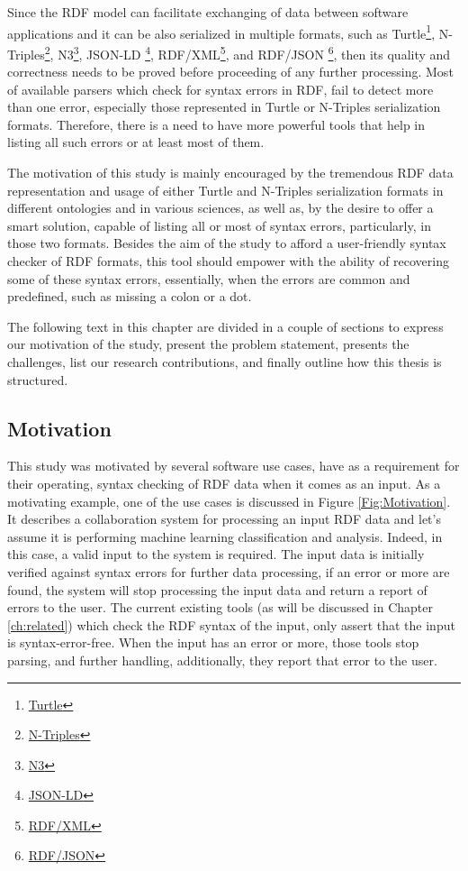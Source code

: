 Since the RDF model can facilitate  exchanging of data between software applications and it can be also serialized in multiple formats, such as Turtle\footnote{\href{https://www.w3.org/TR/turtle/}{Turtle}}, N-Triples\footnote{\href{https://www.w3.org/TR/n-triples/}{N-Triples}}, N3\footnote{\href{https://www.w3.org/TeamSubmission/n3/}{N3}}, JSON-LD	\footnote{\href{https://www.w3.org/2018/jsonld-cg-reports/json-ld/}{JSON-LD}}, RDF{/}XML\footnote{\href{https://www.w3.org/TR/rdf-syntax-grammar/}{RDF{/}XML}}, and RDF{/}JSON	\footnote{\href{https://dvcs.w3.org/hg/rdf/raw-file/default/rdf-json/index.html}{RDF{/}JSON}}, then its  quality and correctness needs to be proved before proceeding of any further processing. Most of available  parsers which check for syntax errors in RDF, fail to detect more than one error, especially those represented in Turtle or N-Triples serialization formats. Therefore, there is a need to have more powerful tools that help in listing all such errors or at least most of them.%


The motivation of this study is mainly  encouraged by the  tremendous RDF data representation and usage of either Turtle and N-Triples serialization formats in different ontologies and in various sciences, as well as, by the desire to offer a smart solution, capable of listing all or most of syntax errors, particularly, in those two formats. Besides the aim of the study to afford a user-friendly syntax checker of RDF formats, this tool should empower with the ability of recovering some of these syntax errors, essentially, when the errors are common and predefined, such as missing a colon or a dot.  


The following text in this chapter are divided in a couple of sections to express our motivation of the study, present the problem statement, presents the challenges, list our research contributions, and finally outline how this thesis is structured.  

\subsection{Motivation}

This study was motivated by several software use cases, have as a requirement for their operating, syntax checking of RDF data when it comes as an input. As a motivating example, one of the use cases is discussed in {Figure \ref{Fig:Motivation}}. It describes a collaboration system for processing an input RDF data and let's assume it is performing machine learning classification and analysis. Indeed, in this case, a valid input to the system is required. The input data is initially verified against syntax errors for further data processing, if an error or more are found, the system will stop processing the input data and return a report of errors to the user. The current existing tools (as will be discussed in Chapter \ref{ch:related}) which check the RDF syntax of the input,  only assert that the input is  syntax-error-free. When the input has an error or more, those tools stop  parsing, and further handling, additionally, they report that error to the user. 

